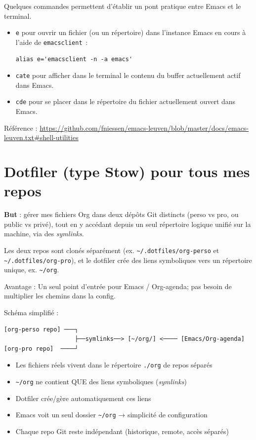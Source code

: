 \documentclass{mcreport}
\begin{document}
Quelques commandes permettent d'établir un pont pratique entre Emacs et le
terminal.

\begin{itemize}
\item \lstinline|e| pour ouvrir un fichier (ou un répertoire) dans l'instance Emacs en cours
à l'aide de \verb|emacsclient|~:

\begin{lstlisting}[language=shell,numbers=none]
  alias e='emacsclient -n -a emacs'
\end{lstlisting}

\item \lstinline|cate| pour afficher dans le terminal le contenu du buffer actuellement actif
dans Emacs.

\item \lstinline|cde| pour se placer dans le répertoire du fichier actuellement ouvert dans
Emacs.
\end{itemize}

Référence :
\url{https://github.com/fniessen/emacs-leuven/blob/master/docs/emacs-leuven.txt\#shell-utilities}
\section{Dotfiler (type Stow) pour tous mes repos}
\label{sec:org8789170}

\textbf{But} : gérer mes fichiers Org dans deux dépôts Git distincts (perso vs pro, ou
public vs privé), tout en y accédant depuis un seul répertoire logique unifié
sur la machine, via des \emph{symlinks}.

Les deux repos sont clonés séparément (ex. \verb|~/.dotfiles/org-perso| et
\verb|~/.dotfiles/org-pro|), et le dotfiler crée des liens symboliques vers un
répertoire unique, ex. \verb|~/org|.

Avantage : Un seul point d'entrée pour Emacs / Org-agenda; pas besoin de
multiplier les chemins dans la config.

Schéma simplifié :

\begin{verbatim}
[org-perso repo] ───┐
                    ├──symlinks──> [~/org/] <──── [Emacs/Org-agenda]
[org-pro repo]  ────┘
\end{verbatim}

\begin{itemize}
\item Les fichiers réels vivent dans le répertoire \verb|./org| de repos séparés
\item \verb|~/org| ne contient QUE des liens symboliques (\emph{symlinks})
\item Dotfiler crée/gère automatiquement ces liens
\item Emacs voit un seul dossier \verb|~/org| → simplicité de configuration
\item Chaque repo Git reste indépendant (historique, remote, accès séparés)
\end{itemize}
\end{document}
